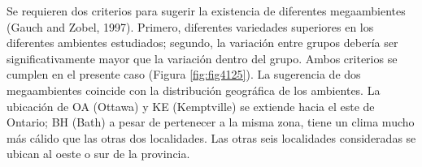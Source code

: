 Se requieren dos criterios para sugerir la existencia de diferentes megaambientes (Gauch and Zobel, 1997). Primero, diferentes variedades superiores en los diferentes ambientes estudiados; segundo, la variación entre grupos debería ser significativamente mayor que la variación dentro del grupo.  Ambos criterios se cumplen en el presente caso (Figura \ref{fig:fig4125}). La sugerencia de dos megaambientes coincide con la distribución geográfica de los ambientes. La ubicación de OA (Ottawa) y KE (Kemptville) se extiende hacia el este de Ontario; BH (Bath) a pesar de pertenecer a la misma zona, tiene un clima mucho más cálido que las otras dos localidades. Las otras seis localidades consideradas se ubican al oeste o sur de la provincia.



